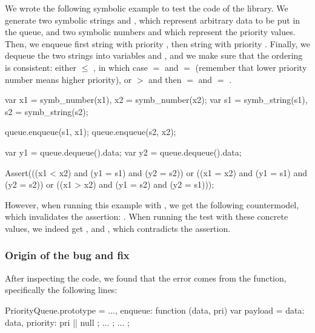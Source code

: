 We wrote the following symbolic example to test the code of the library.
We generate two symbolic strings  and , which represent arbitrary data to be put in the queue, and two symbolic numbers  and  which represent the priority values.
Then, we enqueue first string  with priority , then string  with priority .
Finally, we dequeue the two strings into variables  and , and we make sure that the ordering is consistent: either  $\leq$ , in which case  $=$  and  $=$  (remember that lower priority number means higher priority), or  $>$  and then  $=$  and  $=$ .

\begin{lstjs}
var x1 = symb_number(x1), x2 = symb_number(x2);
var s1 = symb_string(s1), s2 = symb_string(s2);

queue.enqueue(s1, x1);
queue.enqueue(s2, x2);

var y1 = queue.dequeue().data;
var y2 = queue.dequeue().data;

Assert(((x1 < x2) and (y1 = s1) and (y2 = s2)) 
    or ((x1 = x2) and (y1 = s1) and (y2 = s2))
    or ((x1 > x2) and (y1 = s2) and (y2 = s1)));
\end{lstjs}


However, when running this example with \cosette, we get the following countermodel, which invalidates the assertion: .
When running the test with these concrete values, we indeed get , and , which contradicts the assertion.

\subsubsection{Origin of the bug and fix}

After inspecting the code, we found that the error comes from the  function, specifically the following lines:

\begin{lstjs}
PriorityQueue.prototype = {
    ...,
    enqueue: function (data, pri) {
        var payload = {
            data: data,
            priority: pri || null
        };
        ...
    };
    ...
};
\end{lstjs}

